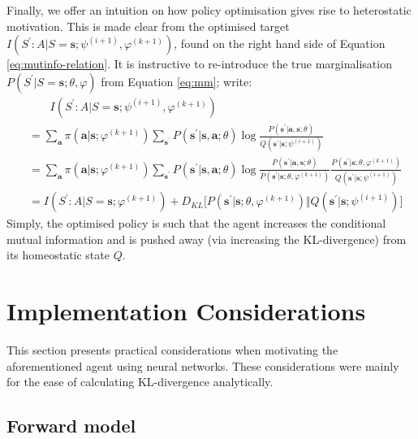 \documentclass[utf8]{frontiersSCNS}
\newcommand{\bs}{\boldsymbol}
\begin{document}
Finally, we offer an intuition on how policy optimisation gives rise to heterostatic motivation. This is made clear from the optimised target $I(S^\prime : A | S=\bs{s}; \psi^{(i+1)}, \varphi^{(k+1)})$, found on the right hand side of Equation \ref{eq:mutinfo-relation}. It is instructive to re-introduce the true marginalisation $P(S^\prime|S=\bs{s}; \theta, \varphi)$ from Equation \ref{eq:mm}; write:
%
	\begin{equation}
	\begin{aligned} \label{eq:hetero}
	&\phantom{=..}
	I(S^\prime : A|S=\bs{s}; \psi^{(i+1)}, \varphi^{(k+1)}) \\
	&=
	\sum_{\bs{a}} \pi(\bs{a}|\bs{s}; \varphi^{(k+1)}) 
	\sum_{\bs{s}^\prime} P(\bs{s}^\prime|\bs{s}, \bs{a}; \theta) 
	\log\frac{P(\bs{s}^\prime|\bs{a}, \bs{s}; \theta)}{Q(\bs{s}^\prime|\bs{s}; \psi^{(i+1)})} \\
	&=
	\sum_{\bs{a}} \pi(\bs{a}|\bs{s}; \varphi^{(k+1)}) 
	\sum_{\bs{s}^\prime} P(\bs{s}^\prime|\bs{s}, \bs{a}; \theta) 
	\log
	\frac{P(\bs{s}^\prime|\bs{a}, \bs{s}; \theta)}  {P(\bs{s}^\prime|\bs{s}; \theta, \varphi^{(k+1)})}
	\frac{P(\bs{s}^\prime|\bs{s}; \theta, \varphi^{(k+1)})}  {Q(\bs{s}^\prime|\bs{s}; \psi^{(i+1)})} \\
	&=
	I(S^\prime : A|S=\bs{s}; \varphi^{(k+1)}) + 
	D_{KL} \bigr[ 
	P(\bs{s}^\prime|\bs{s}; \theta, \varphi^{(k+1)}) 
	\Vert 
	Q(\bs{s}^\prime|\bs{s}; \psi^{(i+1)}) \bigl]
	\end{aligned}
	\end{equation}
%
Simply, the optimised policy is such that the agent increases the conditional mutual information and is pushed away (via increasing the KL-divergence) from its homeostatic state $Q$.

\section{Implementation Considerations} \label{sec:impc}

This section presents practical considerations when motivating the aforementioned agent using neural networks. These considerations were mainly for the ease of calculating KL-divergence analytically. 

\subsection{Forward model}
\end{document}
